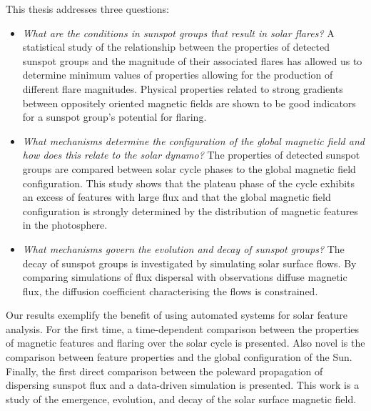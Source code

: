 \begin{abstracts}
This thesis addresses three questions:
\begin{itemize}
\item \emph{What are the conditions in sunspot groups that result in solar flares?} A statistical study of the relationship between the properties of detected sunspot groups and the magnitude of their associated flares has allowed us to determine minimum values of properties allowing for the production of different flare magnitudes. Physical properties related to strong gradients between oppositely oriented magnetic fields are shown to be good indicators for a sunspot group's potential for flaring. 
\item \emph{What mechanisms determine the configuration of the global magnetic field and how does this relate to the solar dynamo?} The properties of detected sunspot groups are compared between solar cycle phases to the global magnetic field configuration. This study shows that the plateau phase of the cycle exhibits an excess of features with large flux and that the global magnetic field configuration is strongly determined by the distribution of magnetic features in the photosphere. 
\item \emph{What mechanisms govern the evolution and decay of sunspot groups?} The decay of sunspot groups is investigated by simulating solar surface flows. By comparing simulations of flux dispersal with observations diffuse magnetic flux, the diffusion coefficient characterising the flows is constrained.
\end{itemize}
Our results exemplify the benefit of using automated systems for solar feature analysis. For the first time, a time-dependent comparison between the properties of magnetic features and flaring over the solar cycle is presented. Also novel is the comparison between feature properties and the global configuration of the Sun. Finally, the first direct comparison between the poleward propagation of dispersing sunspot flux and a data-driven simulation is presented. This work is a study of the emergence, evolution, and decay of the solar surface magnetic field.



\end{abstracts}
